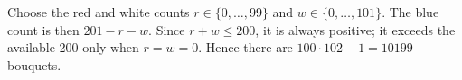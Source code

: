 Choose the red and white counts $r\in\{0,\ldots,99\}$ and $w\in\{0,\ldots,101\}$. The blue count is then $201-r-w$. Since $r+w\le200$, it is always positive; it exceeds the available 200 only when $r=w=0$. Hence there are $100\cdot102-1=\boxed{10199}$ bouquets.
